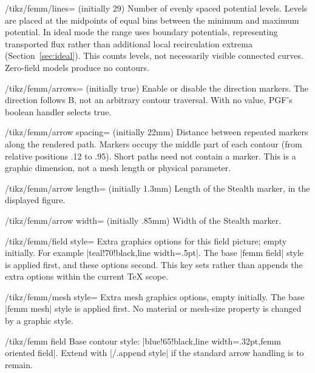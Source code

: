 \begin{key}{/tikz/femm/lines= (initially 29)}
Number of evenly spaced potential levels. Levels are placed at the
midpoints of equal bins between the minimum and maximum potential.
In ideal mode the range uses boundary potentials, representing transported
flux rather than additional local recirculation extrema (Section~\ref{sec:ideal}).
This counts levels, not necessarily visible connected curves. Zero-field
models produce no contours.
\end{key}
\begin{key}{/tikz/femm/arrows= (initially true)}
Enable or disable the direction markers. The direction follows B, not an
arbitrary contour traversal. With no value, PGF's boolean handler selects true.
\end{key}
\begin{key}{/tikz/femm/arrow spacing= (initially 22mm)}
Distance between repeated markers along the rendered path. Markers occupy
the middle part of each contour (from relative positions .12 to .95).
Short paths need not contain a marker. This is a graphic dimension, not
a mesh length or physical parameter.
\end{key}
\begin{key}{/tikz/femm/arrow length= (initially 1.3mm)}
Length of the Stealth marker, in the displayed figure.
\end{key}
\begin{key}{/tikz/femm/arrow width= (initially .85mm)}
Width of the Stealth marker.
\end{key}
\begin{key}{/tikz/femm/field style=}
Extra graphics options for this field picture; empty initially. For
example |{teal!70!black,line width=.5pt}|. The base |femm field| style is
applied first, and these options second. This key sets rather than appends
the extra options within the current TeX scope.
\end{key}
\begin{key}{/tikz/femm/mesh style=}
Extra mesh graphics options, empty initially. The base |femm mesh| style
is applied first. No material or mesh-size property is changed by a
graphic style.
\end{key}
\begin{stylekey}{/tikz/femm field}
Base contour style: |blue!65!black,line width=.32pt,femm oriented field|.
Extend with |/.append style| if the standard arrow handling is to remain.
\end{stylekey}

